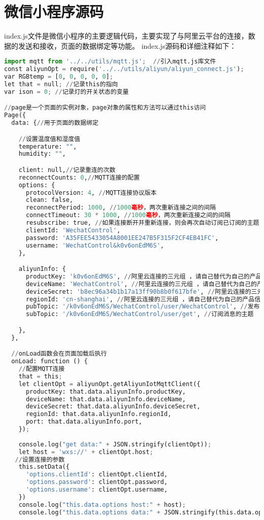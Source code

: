 \documentclass[12pt,hyperref,a4paper,UTF8]{ctexart}
\begin{document}
\section{微信小程序源码}
index.js文件是微信小程序的主要逻辑代码，主要实现了与阿里云平台的连接，数据的发送和接收，页面的数据绑定等功能。
index.js源码和详细注释如下：
\begin{lstlisting}[language=python]
import mqtt from '../../utils/mqtt.js';  //引入mqtt.js库文件
const aliyunOpt = require('../../utils/aliyun/aliyun_connect.js');
var RGBtemp = [0, 0, 0, 0, 0];
let that = null; //记录this的指向
var ison = 0; //记录灯的开关状态的变量

//page是一个页面的实例对象，page对象的属性和方法可以通过this访问
Page({
  data: {//用于页面的数据绑定

    //设置温度值和湿度值 
    temperature: "",
    humidity: "",

    client: null,//记录重连的次数
    reconnectCounts: 0,//MQTT连接的配置
    options: {
      protocolVersion: 4, //MQTT连接协议版本
      clean: false,
      reconnectPeriod: 1000, //1000毫秒，两次重新连接之间的间隔
      connectTimeout: 30 * 1000, //1000毫秒，两次重新连接之间的间隔
      resubscribe: true, //如果连接断开并重新连接，则会再次自动订阅已订阅的主题（默认true）
      clientId: 'WechatControl',
      password: 'A35FEE5433054A8001EE247B5F315F2CF4EB41FC',
      username: 'WechatControl&k0v6onEdM6S',
    },

    aliyunInfo: {
      productKey: 'k0v6onEdM6S', //阿里云连接的三元组 ，请自己替代为自己的产品信息!!
      deviceName: 'WechatControl', //阿里云连接的三元组 ，请自己替代为自己的产品信息!!
      deviceSecret: 'b8ec96a34b1b17a13ff90b8b0f617bfe', //阿里云连接的三元组 ，请自己替代为自己的产品信息!!
      regionId: 'cn-shanghai', //阿里云连接的三元组 ，请自己替代为自己的产品信息!!
      pubTopic: '/k0v6onEdM6S/WechatControl/user/WechatControl', //发布消息的主题
      subTopic: '/k0v6onEdM6S/WechatControl/user/get', //订阅消息的主题

    },
  },

  //onLoad函数会在页面加载后执行
  onLoad: function () {
    //配置MQTT连接
    that = this;
    let clientOpt = aliyunOpt.getAliyunIotMqttClient({
      productKey: that.data.aliyunInfo.productKey,
      deviceName: that.data.aliyunInfo.deviceName,
      deviceSecret: that.data.aliyunInfo.deviceSecret,
      regionId: that.data.aliyunInfo.regionId,
      port: that.data.aliyunInfo.port,
    });
  
    console.log("get data:" + JSON.stringify(clientOpt));
    let host = 'wxs://' + clientOpt.host;
   //设置连接的参数
    this.setData({
      'options.clientId': clientOpt.clientId,
      'options.password': clientOpt.password,
      'options.username': clientOpt.username,
    })
    console.log("this.data.options host:" + host);
    console.log("this.data.options data:" + JSON.stringify(this.data.options));


\end{lstlisting}
\end{document}
